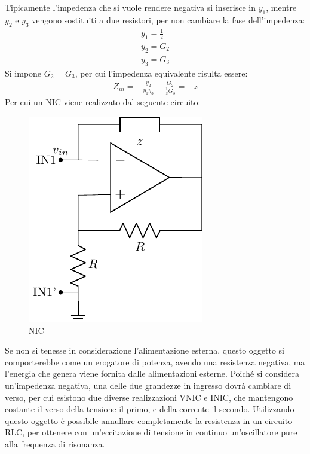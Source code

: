 \documentclass{article}
\numberwithin{equation}{subsection}
\begin{document}
Tipicamente l'impedenza che si vuole rendere negativa si inserisce in $y_1$, mentre $y_2$ e $y_3$ vengono sostituiti a due resistori, per non cambiare 
la fase dell'impedenza:
\begin{gather*}
    y_1=\displaystyle\frac{1}{z}\\
    y_2=G_2\\
    y_3=G_3
\end{gather*}
Si impone $G_2=G_3$, per cui l'impedenza equivalente risulta essere:
\begin{gather*}
    Z_{in}=\displaystyle-\frac{y_2}{y_1y_3}-\frac{G_2}{\displaystyle\frac{1}{z}G_3}=-z
\end{gather*}
Per cui un NIC viene realizzato dal seguente circuito:
\begin{figure}[H]%
    \centering
    \includegraphics{amplificatore-nic-resistore.pdf}%
    \caption{NIC}
    \label{fig:amplificatore-nic-resistori}
\end{figure}   

Se non si tenesse in considerazione l'alimentazione esterna, questo oggetto si comporterebbe come un erogatore di potenza, avendo una 
resistenza negativa, ma l'energia che genera viene fornita dalle alimentazioni esterne. 
Poiché si considera un'impedenza negativa, una delle due grandezze in ingresso dovrà cambiare di verso, per cui esistono due diverse realizzazioni 
VNIC e INIC, che mantengono costante il verso della tensione il primo, e della corrente il secondo. 
Utilizzando questo oggetto è possibile annullare completamente la resistenza in un circuito RLC, per ottenere con un'eccitazione di tensione in continuo 
un'oscillatore pure alla frequenza di risonanza. 
\end{document}
